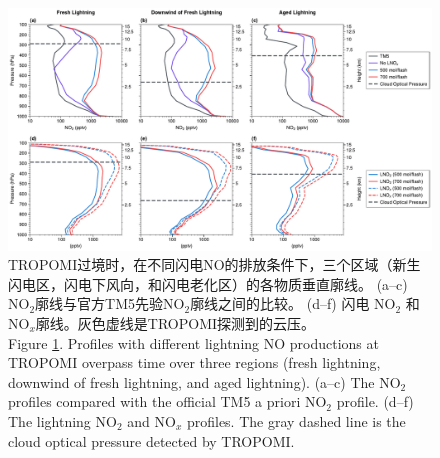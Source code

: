 \begin{figure}[!htbp]
    \includegraphics[width=17cm]{./figures/nox_profile.pdf}
    \caption{
    TROPOMI过境时，在不同闪电NO的排放条件下，三个区域（新生闪电区，闪电下风向，和闪电老化区）的各物质垂直廓线。
     (a--c) NO$_2$廓线与官方TM5先验NO$_2$廓线之间的比较。
     (d--f) 闪电 NO$_2$ 和 NO$_x$廓线。灰色虚线是TROPOMI探测到的云压。\\
     Figure \ref{fig:nox_profile}. Profiles with different lightning NO productions at TROPOMI overpass time over three regions (fresh lightning, downwind of fresh lightning, and aged lightning).
    (a--c) The NO$_2$ profiles compared with the official TM5 a priori NO$_2$ profile.
    (d--f) The lightning NO$_2$ and NO$_x$ profiles.
    The gray dashed line is the cloud optical pressure detected by TROPOMI.
    }
    \label{fig:nox_profile}
\end{figure}


